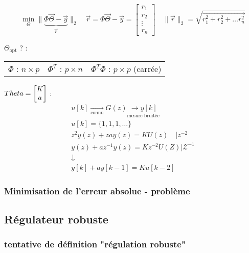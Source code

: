 \documentclass[document.tex]{subfiles}
\begin{document}
$$
\underset{\Theta}{\min} \parallel \underbrace{\Phi \vec{\Theta}-\vec{y}}_{\vec{r}} \parallel_2 \quad \vec{r} = \Phi \vec{\Theta}-\vec{y}=\begin{bmatrix}
r_1 \\ r_2 \\ \vdots \\ r_n
\end{bmatrix} \quad \parallel\vec{r}\parallel_2= \sqrt{\vec{r_1^2 + r_2^2 + \ldots r_n^2}}
$$

$ \Theta_{\text{opt}} $ ? :\\

\begin{tabular}{l l l}
$\Phi$ : $n \times p$ & $\Phi^T$ : $p \times n$ & $\Phi^T \Phi$ : $p \times p$ (carrée)
\end{tabular}

$\\Theta = \begin{bmatrix} K \\ a \end{bmatrix}$ :\\

$$  
\begin{array}{c}
	u[k]\underset{\text{connu}}{\longrightarrow}\boxed{G(z)}\underset{\text{mesure bruitée}}{\longrightarrow y[k]} \\[12pt]
	u[k] = \{1,1,1,\ldots\} \\[6pt]
	z^2 y(z) + z a y(z) = K U(z) \quad \vert z^{-2} \\[6pt]
	y(z) + a z^{-1}y(z) = K z^{-2}U(Z) \vert \mathcal{Z}^{-1}\\[6pt]
	\downarrow \\[6pt]
	\boxed{y[k]+ a y[k-1]=Ku[k-2]}
\end{array}
$$

\subsubsection{Minimisation de l'erreur absolue - problème}


\subsection{Régulateur robuste}

\subsubsection{tentative de définition "régulation robuste"}
\end{document}

